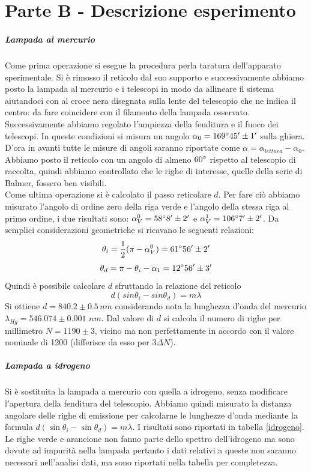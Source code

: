 \documentclass[10pt,a4paper]{article}
\begin{document}
\section{Parte B - Descrizione esperimento}
\subparagraph{Lampada al mercurio}
Come prima operazione si esegue la procedura perla taratura dell'apparato sperimentale. Si è rimosso il reticolo dal suo supporto e successivamente abbiamo posto la lampada al mercurio e i telescopi in modo da allineare il sistema aiutandoci con al croce nera disegnata sulla lente del telescopio che ne indica il centro: da fare coincidere con il filamento della lampada osservato. Successivamente abbiamo regolato l'ampiezza della fenditura e il fuoco dei telescopi. In queste condizioni si misura un angolo $\alpha_0 = 169 \degree 45 '\pm 1'$ sulla ghiera. D'ora in avanti tutte le misure di angoli saranno riportate come $\alpha=\alpha_{lettura}-\alpha_0$. Abbiamo posto il reticolo con un angolo di almeno $60\degree$ rispetto al telescopio di raccolta, quindi abbiamo controllato che le righe di interesse, quelle della serie di Balmer, fossero ben visibili.\\
Come ultima operazione si è calcolato il passo reticolare $d$. Per fare ciò abbiamo misurato l'angolo di ordine zero della riga verde e l'angolo della stessa riga al primo ordine, i due risultati sono: $\alpha_V^{0} = 58 \degree 8 ' \pm 2'$ e $\alpha_V^{1} = 106 \degree 7' \pm 2'$. Da semplici considerazioni geometriche si ricavano le seguenti relazioni:
\begin{equation}
\theta_i=\frac{1}{2}(\pi-\alpha_V^{0})=61\degree 56'\pm2'
\end{equation}
\begin{equation}
\theta_d=\pi-\theta_i-\alpha_1= 12 \degree 56' \pm 3'
\end{equation}
Quindi è possibile calcolare $d$ sfruttando la relazione del reticolo 
\begin{equation}
d(sin{\theta_i}-sin{\theta_d})=m\lambda
\end{equation}
Si ottiene $d = 840.2 \pm 0.5 \,nm$ considerando nota la lunghezza d'onda del mercurio $\lambda_{Hg}=546.074\pm0.001\,\,nm$. Dal valore di $d$ si calcola il numero di righe per millimetro $N = 1190 \pm 3$, vicino ma non perfettamente in accordo con il valore nominale di 1200 (differisce da esso per $3 \Delta N$).

\subparagraph{Lampada a idrogeno}
Si è sostituita la lampada a mercurio con quella a idrogeno, senza modificare l'apertura della fenditura del telescopio. Abbiamo quindi misurato la distanza angolare delle righe di emissione per calcolarne le lunghezze d'onda mediante la formula $d(\sin{\theta_i}-\sin{\theta_d})=m\lambda$. I risultati sono riportati in tabella \ref{idrogeno}. Le righe verde e arancione non fanno parte dello spettro dell'idrogeno ma sono dovute ad impurità nella lampada pertanto i dati relativi a queste non saranno necessari nell'analisi dati, ma sono riportati nella tabella per completezza.\\
\end{document}
